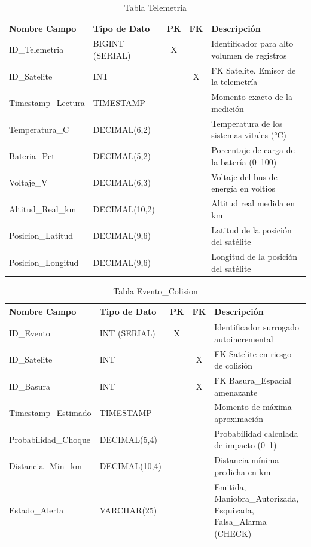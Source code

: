 \begin{table}[H]
\centering
\footnotesize
\begin{tabular}{|l|l|c|c|p{5cm}|}
\hline
\textbf{Nombre Campo} & \textbf{Tipo de Dato} & \textbf{PK} & \textbf{FK} & \textbf{Descripción} \\
\hline
ID\_Telemetria & BIGINT (SERIAL) & X & & Identificador para alto volumen de registros \\
\hline
ID\_Satelite & INT & & X & FK Satelite. Emisor de la telemetría \\
\hline
Timestamp\_Lectura & TIMESTAMP & & & Momento exacto de la medición \\
\hline
Temperatura\_C & DECIMAL(6,2) & & & Temperatura de los sistemas vitales (°C) \\
\hline
Bateria\_Pct & DECIMAL(5,2) & & & Porcentaje de carga de la batería (0--100) \\
\hline
Voltaje\_V & DECIMAL(6,3) & & & Voltaje del bus de energía en voltios \\
\hline
Altitud\_Real\_km & DECIMAL(10,2) & & & Altitud real medida en km \\
\hline
Posicion\_Latitud & DECIMAL(9,6) & & & Latitud de la posición del satélite \\
\hline
Posicion\_Longitud & DECIMAL(9,6) & & & Longitud de la posición del satélite \\
\hline
\end{tabular}
\caption{Tabla Telemetria}
\end{table}

\begin{table}[H]
\centering
\footnotesize
\begin{tabular}{|l|l|c|c|p{5cm}|}
\hline
\textbf{Nombre Campo} & \textbf{Tipo de Dato} & \textbf{PK} & \textbf{FK} & \textbf{Descripción} \\
\hline
ID\_Evento & INT (SERIAL) & X & & Identificador surrogado autoincremental \\
\hline
ID\_Satelite & INT & & X & FK Satelite en riesgo de colisión \\
\hline
ID\_Basura & INT & & X & FK Basura\_Espacial amenazante \\
\hline
Timestamp\_Estimado & TIMESTAMP & & & Momento de máxima aproximación \\
\hline
Probabilidad\_Choque & DECIMAL(5,4) & & & Probabilidad calculada de impacto (0--1) \\
\hline
Distancia\_Min\_km & DECIMAL(10,4) & & & Distancia mínima predicha en km \\
\hline
Estado\_Alerta & VARCHAR(25) & & & Emitida, Maniobra\_Autorizada, Esquivada, Falsa\_Alarma (CHECK) \\
\hline
\end{tabular}
\caption{Tabla Evento\_Colision}
\end{table}

